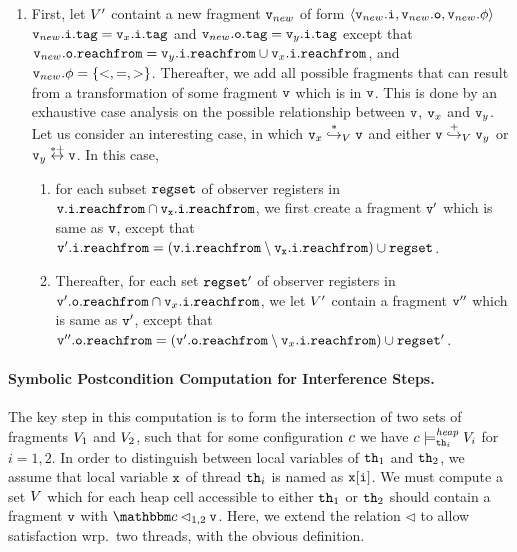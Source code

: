 \begin{enumerate}
  \item
    First, let $V'$ containt a new fragment $\mathtt{v}_{new}$ of form
    $\left\langle\mathtt{v}_{new}.\mathtt{i},\mathtt{v}_{new}.\mathtt{o},\mathtt{v}_{new}.\phi\right\rangle$
    $\mathtt{v}_{new}.\mathtt{i}.\mathtt{tag} = \mathtt{v}_x.\mathtt{i}.\mathtt{tag}$ and $\mathtt{v}_{new}.\mathtt{o}.\mathtt{tag} = \mathtt{v}_y.\mathtt{i}.\mathtt{tag}$ except that $\mathtt{v}_{new}.\mathtt{o}.\mathtt{reachfrom} = \mathtt{v}_y.\mathtt{i}.\mathtt{reachfrom} \cup \mathtt{v}_x.\mathtt{i}.\mathtt{reachfrom}$,
    and $\mathtt{v}_{new}.\phi = \left\{<,=,>\right\}$.
Thereafter, we add all possible fragments that can result from a transformation
of some fragment $\mathtt{v}$ which is in $\mathtt{v}$. This is done by an exhaustive
case analysis on the possible
relationship between $\mathtt{v}$, $\mathtt{v}_x$ and $\mathtt{v}_y$.
Let us consider an interesting case, in which
$\mathtt{v}_x \overset{*}\hookrightarrow_{V} \mathtt{v}$ and either $\mathtt{v} \overset{+}\hookrightarrow_{V} \mathtt{v}_y$ or $\mathtt{v}_y \overset{*+}\leftrightarrow \mathtt{v}$.
In this case,
\begin{enumerate}
\item
  for each subset $\mathtt{regset}$ of observer registers in $\tt \mathtt{v}.\mathtt{i}.\mathtt{reachfrom} \cap \mathtt{v}_x.\mathtt{i}.\mathtt{reachfrom}$, we first create
  a fragment $\mathtt{v}'$ which is same as $\mathtt{v}$, except that $\mathtt{v}'.\mathtt{i}.\mathtt{reachfrom} = (\tt \mathtt{v}.\mathtt{i}.\mathtt{reachfrom} \setminus \mathtt{v}_x.\mathtt{i}.\mathtt{reachfrom}) \cup \mathtt{regset}$.
\item
  Thereafter, 
for each set $\mathtt{regset}'$ of observer registers in $\mathtt{v}'.\mathtt{o}.\mathtt{reachfrom} \cap \mathtt{v}_x.\mathtt{i}.\mathtt{reachfrom}$,  we let $V'$ contain a fragment
$\mathtt{v}''$ which is same as $\mathtt{v}'$, except that $\mathtt{v}''.\mathtt{o}.\mathtt{reachfrom} = (\mathtt{v}'.\mathtt{o}.\mathtt{reachfrom} \setminus \mathtt{v}_x.\mathtt{i}.\mathtt{reachfrom}) \cup \mathtt{regset}'$. 
\end{enumerate}
\end{enumerate}

\paragraph{Symbolic Postcondition Computation for Interference Steps.} 
The key step in this computation is
to form the intersection of two sets of fragments
$V_1$ and $V_2$, such that for some configuration $c$
we have $c \models_{{\tt th}_i}^{\mathit{heap}} V_i$ for $i=1,2$.
In order to distinguish
between local variables of ${\tt th}_1$ and ${\tt th}_2$, we assume that local variable $\mathtt{x}$ of thread ${\tt th}_i$ is named as $\mathtt{x[i]}$.
We must compute a set $V$ which for each
heap cell accessible to either ${\tt th}_1$ or ${\tt th}_2$ should
contain a fragment $\mathtt{v}$ with $\cell \satfrag{1,2} \frag$.
Here, we extend the relation $\lhd$ to allow satisfaction wrp.\ two threads,
with the obvious definition.

